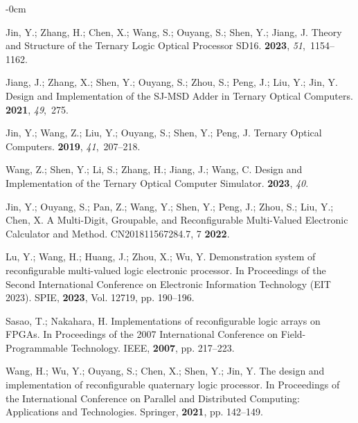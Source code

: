 \documentclass[electronics,article,accept,pdftex,moreauthors]{Definitions/mdpi}
\begin{document}
\begin{adjustwidth}{-\extralength}{0cm}
\begin{thebibliography}{999}
Jin, Y.; Zhang, H.; Chen, X.; Wang, S.; Ouyang, S.; Shen, Y.; Jiang, J.
\newblock Theory and Structure of the Ternary Logic Optical Processor SD16.
 {\bf \textbf{2023}}, {\em
  51},~1154--1162.

Jiang, J.; Zhang, X.; Shen, Y.; Ouyang, S.; Zhou, S.; Peng, J.; Liu, Y.; Jin,
  Y.
\newblock Design and Implementation of the SJ-MSD Adder in Ternary Optical
  Computers.
 {\bf \textbf{2021}}, {\em
  49},~275.

Jin, Y.; Wang, Z.; Liu, Y.; Ouyang, S.; Shen, Y.; Peng, J.
\newblock Ternary Optical Computers.
 {\bf \textbf{2019}}, {\em
  41},~207--218.

Wang, Z.; Shen, Y.; Li, S.; Zhang, H.; Jiang, J.; Wang, C.
\newblock Design and Implementation of the Ternary Optical Computer Simulator.
 {\bf \textbf{2023}},
  {\em 40}.

Jin, Y.; Ouyang, S.; Pan, Z.; Wang, Y.; Shen, Y.; Peng, J.; Zhou, S.; Liu, Y.;
  Chen, X.
\newblock A Multi-Digit, Groupable, and Reconfigurable Multi-Valued Electronic
  Calculator and Method.
\newblock CN201811567284.7,  7 \textbf{2022}.

Lu, Y.; Wang, H.; Huang, J.; Zhou, X.; Wu, Y.
\newblock Demonstration system of reconfigurable multi-valued logic electronic
  processor.
\newblock In Proceedings of the Second International Conference on Electronic
  Information Technology (EIT 2023). SPIE,  \textbf{2023}, Vol. 12719, pp.
  190--196.

Sasao, T.; Nakahara, H.
\newblock Implementations of reconfigurable logic arrays on FPGAs.
\newblock In Proceedings of the 2007 International Conference on
  Field-Programmable Technology. IEEE,  \textbf{2007}, pp. 217--223.

Wang, H.; Wu, Y.; Ouyang, S.; Chen, X.; Shen, Y.; Jin, Y.
\newblock The design and implementation of reconfigurable quaternary logic
  processor.
\newblock In Proceedings of the International Conference on Parallel and
  Distributed Computing: Applications and Technologies. Springer,
  \textbf{2021}, pp. 142--149.


\end{thebibliography}
\end{adjustwidth}
\end{document}
